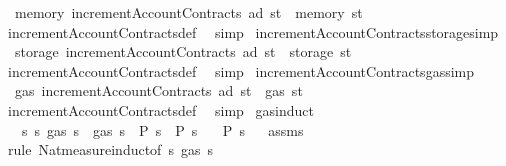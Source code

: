 \begin{isabellebody}
\ \ {\isachardoublequoteopen}memory\ {\isacharparenleft}{\kern0pt}incrementAccountContracts\ ad\ st{\isacharparenright}{\kern0pt}\ {\isacharequal}{\kern0pt}\ memory\ st{\isachardoublequoteclose}\isanewline
%
\isadelimproof
\ \ %
\endisadelimproof
%
\isatagproof
{}\isamarkupfalse%
\ incrementAccountContracts{\isacharunderscore}{\kern0pt}def\ \isamarkupfalse%
\ simp%
\endisatagproof
{\isafoldproof}%
%
\isadelimproof
\isanewline
%
\endisadelimproof
\isanewline
{}\isamarkupfalse%
\ incrementAccountContracts{\isacharunderscore}{\kern0pt}storage{\isacharbrackleft}{\kern0pt}simp{\isacharbrackright}{\kern0pt}{\isacharcolon}{\kern0pt}\isanewline
\ \ {\isachardoublequoteopen}storage\ {\isacharparenleft}{\kern0pt}incrementAccountContracts\ ad\ st{\isacharparenright}{\kern0pt}\ {\isacharequal}{\kern0pt}\ storage\ st{\isachardoublequoteclose}\isanewline
%
\isadelimproof
\ \ %
\endisadelimproof
%
\isatagproof
{}\isamarkupfalse%
\ incrementAccountContracts{\isacharunderscore}{\kern0pt}def\ \isamarkupfalse%
\ simp%
\endisatagproof
{\isafoldproof}%
%
\isadelimproof
\isanewline
%
\endisadelimproof
\isanewline
{}\isamarkupfalse%
\ incrementAccountContracts{\isacharunderscore}{\kern0pt}gas{\isacharbrackleft}{\kern0pt}simp{\isacharbrackright}{\kern0pt}{\isacharcolon}{\kern0pt}\isanewline
\ \ {\isachardoublequoteopen}gas\ {\isacharparenleft}{\kern0pt}incrementAccountContracts\ ad\ st{\isacharparenright}{\kern0pt}\ {\isacharequal}{\kern0pt}\ gas\ st{\isachardoublequoteclose}\isanewline
%
\isadelimproof
\ \ %
\endisadelimproof
%
\isatagproof
{}\isamarkupfalse%
\ incrementAccountContracts{\isacharunderscore}{\kern0pt}def\ \isamarkupfalse%
\ simp%
\endisatagproof
{\isafoldproof}%
%
\isadelimproof
\isanewline
%
\endisadelimproof
\isanewline
{}\isamarkupfalse%
\ gas{\isacharunderscore}{\kern0pt}induct{\isacharcolon}{\kern0pt}\isanewline
\ \ \ {\isachardoublequoteopen}{\isasymAnd}s{\isachardot}{\kern0pt}\ {\isasymforall}s{\isacharprime}{\kern0pt}{\isachardot}{\kern0pt}\ gas\ s{\isacharprime}{\kern0pt}\ {\isacharless}{\kern0pt}\ gas\ s\ {\isasymlongrightarrow}\ P\ s{\isacharprime}{\kern0pt}\ {\isasymLongrightarrow}\ P\ s{\isachardoublequoteclose}\isanewline
\ \ \ {\isachardoublequoteopen}P\ s{\isachardoublequoteclose}%
\isadelimproof
\ %
\endisadelimproof
%
\isatagproof
{}\isamarkupfalse%
\ assms\ \isamarkupfalse%
\ {\isacharparenleft}{\kern0pt}rule\ Nat{\isachardot}{\kern0pt}measure{\isacharunderscore}{\kern0pt}induct{\isacharbrackleft}{\kern0pt}of\ {\isachardoublequoteopen}{\isasymlambda}s{\isachardot}{\kern0pt}\ gas\ s{\isachardoublequoteclose}{\isacharbrackright}{\kern0pt}{\isacharparenright}{\kern0pt}%

\end{isabellebody}
